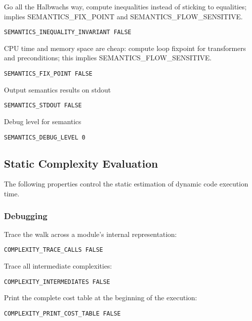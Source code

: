 Go all the Halbwachs way, compute inequalities instead of sticking
to equalities; implies SEMANTICS\_FIX\_POINT and SEMANTICS\_FLOW\_SENSITIVE.

\begin{verbatim}
SEMANTICS_INEQUALITY_INVARIANT FALSE
\end{verbatim}

CPU time and memory space are cheap: compute loop fixpoint for
transformers and preconditions; this implies SEMANTICS\_FLOW\_SENSITIVE.

\begin{verbatim}
SEMANTICS_FIX_POINT FALSE
\end{verbatim}

Output semantics results on stdout

\begin{verbatim}
SEMANTICS_STDOUT FALSE
\end{verbatim}

Debug level for semantics

\begin{verbatim}
SEMANTICS_DEBUG_LEVEL 0
\end{verbatim}

\subsection{Static Complexity Evaluation}

The following properties control the static estimation of dynamic code
execution time.

\subsubsection{Debugging}

Trace the walk across a module's internal representation:

\begin{verbatim}
COMPLEXITY_TRACE_CALLS FALSE
\end{verbatim}

Trace all intermediate complexities:

\begin{verbatim}
COMPLEXITY_INTERMEDIATES FALSE
\end{verbatim}

Print the complete cost table at the beginning of the execution:

\begin{verbatim}
COMPLEXITY_PRINT_COST_TABLE FALSE
\end{verbatim}

